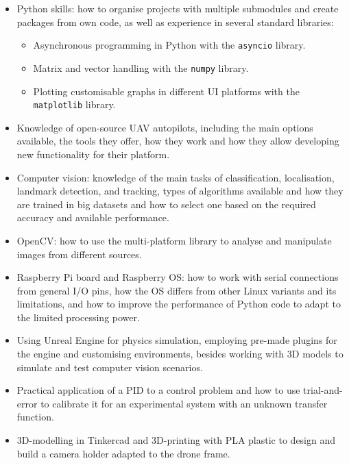 \begin{itemize}
    \item Python skills: how to organise projects with multiple submodules and create packages from own code, as well as experience in several standard libraries:
    \begin{itemize}
        \item Asynchronous programming in Python with the \texttt{asyncio} library.
        \item Matrix and vector handling with the \texttt{numpy} library.
        \item Plotting customisable graphs in different UI platforms with the \texttt{matplotlib} library.
    \end{itemize}

    \item Knowledge of open-source UAV autopilots, including the main options available, the tools they offer, how they work and how they allow developing new functionality for their platform.

    \item Computer vision: knowledge of the main tasks of classification, localisation, landmark detection, and tracking, types of algorithms available and how they are trained in big datasets and how to select one based on the required accuracy and available performance.

    \item OpenCV: how to use the multi-platform library to analyse and manipulate images from different sources.

    \item Raspberry Pi board and Raspberry OS: how to work with serial connections from general I/O pins, how the OS differs from other Linux variants and its limitations, and how to improve the performance of Python code to adapt to the limited processing power.

    \item Using Unreal Engine for physics simulation, employing pre-made plugins for the engine and customising environments, besides working with 3D models to simulate and test computer vision scenarios.

    \item Practical application of a PID to a control problem and how to use trial-and-error to calibrate it for an experimental system with an unknown transfer function.

    \item 3D-modelling in Tinkercad and 3D-printing with PLA plastic to design and build a camera holder adapted to the drone frame.
\end{itemize}


